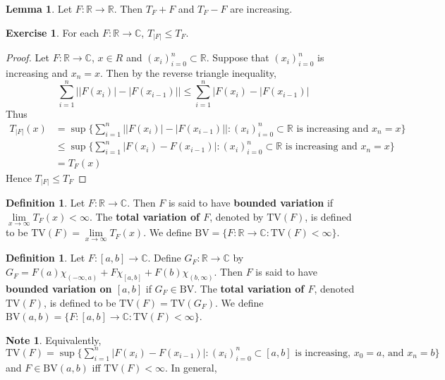\documentclass{book}
\theoremstyle{definition}
\newtheorem{defn}[definition]{Definition}
\newtheorem{note}[definition]{Note}
\newtheorem{lem}[definition]{Lemma}
\newtheorem{ex}[definition]{Exercise}
\newcommand{\C}{\mathbb{C}}
\newcommand{\R}{\mathbb{R}}
\newcommand{\lex}[1]{\label{ex:#1}}
\newcommand{\ld}[1]{\label{defn:#1}}
\DeclareMathOperator*{\0}{\mbf{0}}
\DeclareMathOperator*{\1}{\mbf{1}}
\newcommand{\BV}{\text{BV}}
\newcommand{\TV}{\text{TV}}
\begin{document}
	\begin{lem}
		Let $F:\R \rightarrow \R$. Then $T_F+F$ and $T_F-F$ are increasing.
	\end{lem}
	
	\begin{ex} \lex{00000} 
		For each $F:\R \rightarrow \C$, $T_{|F|} \leq T_F$.
	\end{ex}
	
	\begin{proof}
		Let $F:\R \rightarrow \C$, $x \in R$ and $(x_i)_{i=0}^n \subset \R$. Suppose that $(x_i)_{i=0}^n$ is increasing and $x_n=x$. Then by the reverse triangle inequality, $$ \sum_{i=1}^n\big||F(x_i)|-|F(x_{i-1})|\big|
		\leq \sum_{i=1}^n\big|F(x_i)-|F(x_{i-1})\big|$$
		Thus 
		\begin{align*}
			T_{|F|}(x) 
			&= \sup\bigg \{\sum_{i=1}^{n}\big||F(x_{i})| - |F(x_{i-1})|\big|: (x_i)_{i=0}^n \subset \R \text{ is increasing and } x_n=x  \bigg \} \\
			& \leq \sup\bigg \{\sum_{i=1}^{n}|F(x_{i}) - F(x_{i-1})|: (x_i)_{i=0}^n \subset \R \text{ is increasing and } x_n=x  \bigg \} \\
			&= T_F(x)
		\end{align*}
		Hence $T_{|F|} \leq T_F$
	\end{proof}
	
	\begin{defn} \ld{00000} 
		Let $F:\R \rightarrow \C$. Then $F$ is said to have \textbf{bounded variation} if $\lim \limits_{x \rightarrow \infty}T_F(x)<\infty$. The \textbf{total variation of $F$}, denoted by $\TV(F)$, is defined to be $\TV(F) = \lim\limits_{x\rightarrow \infty}T_F(x)$.
		We define $\BV = \{F:\R \rightarrow \C: \TV(F)<\infty \}$.
	\end{defn}
	
	\begin{defn} \ld{00000} 
		Let $F:[a,b] \rightarrow \C$. Define $G_F:\R \rightarrow \C$ by $G_F = F(a)\chi_{(-\infty,a)} + F\chi_{[a,b]}+F(b)\chi_{(b,\infty)}$. Then $F$ is said to have \textbf{bounded variation on $[a,b]$} if $G_F \in \BV$. The \textbf{total variation of $F$}, denoted $\TV(F)$, is defined to be $\TV(F) = \TV(G_F)$. We define $\BV(a,b) = \{F:[a,b] \rightarrow \C: \TV(F) < \infty\}$.
	\end{defn}
	
	\begin{note}
		Equivalently, $\TV(F) = \sup \big \{\sum_{i=1}^{n}|F(x_{i}) - F(x_{i-1})|: (x_i)_{i=0}^n \subset [a,b] \text{ is increasing, } x_0=a \text{, and } x_n=b\big \}$ and $F \in \BV(a,b)$ iff $\TV(F) < \infty$. In general, 
	\end{note}
	
\end{document}
